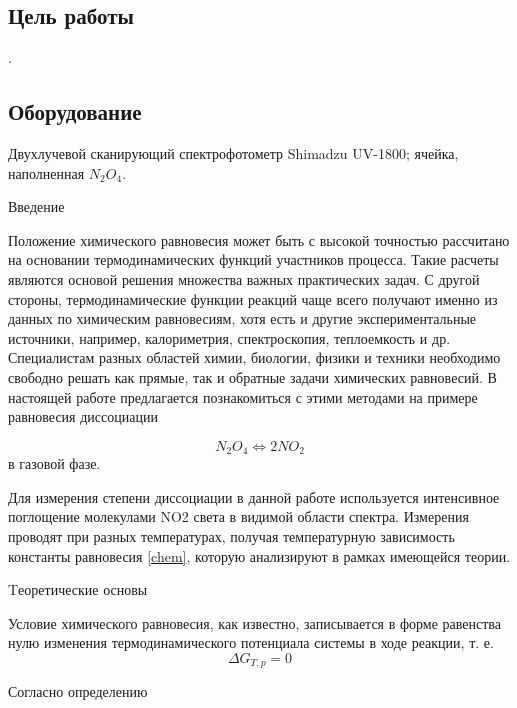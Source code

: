 \documentclass[a4paper,12pt]{article} %
\begin{document}

\newpage

\subsection*{Цель работы}
.

\subsection*{Оборудование}
Двухлучевой сканирующий спектрофотометр Shimadzu UV-1800; ячейка, наполненная \(N_2O_4\).

\begin{center}
Введение
\end{center}

Положение химического равновесия может быть с высокой точностью рассчитано на основании термодинамических функций участников процесса. Такие расчеты являются основой решения множества важных практических задач. С другой стороны, термодинамические функции реакций чаще всего получают именно из данных по химическим равновесиям, хотя есть и другие экспериментальные источники, например, калориметрия, спектроскопия, теплоемкость и др. Специалистам разных областей химии, биологии, физики и техники необходимо свободно решать как прямые, так и обратные задачи химических равновесий.
В настоящей работе предлагается познакомиться с этими методами на примере равновесия диссоциации

\begin{equation}\label{chem}
N_2O_4 \Leftrightarrow 2NO_2
\end{equation}
в газовой фазе.

Для измерения степени диссоциации в данной работе используется интенсивное поглощение молекулами NO2 света в видимой области спектра. Измерения проводят при разных температурах, получая температурную зависимость константы равновесия \eqref{chem}, которую анализируют в рамках имеющейся теории.

\begin{center}
{ \LARGE Tеоретические основы}
\end{center}
Условие химического равновесия, как известно, записывается в форме равенства нулю изменения термодинамического потенциала системы в ходе реакции, т. е.
\begin{equation}
 \Delta G_{T,p}  = 0
\end{equation}	

Согласно определению
\end{document}
